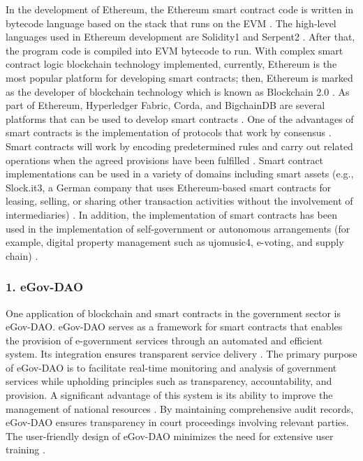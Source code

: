 In the development of Ethereum, the Ethereum smart contract code is written in bytecode language based on the stack that runs on the  \ac{EVM} \cite{everett_kevm}\cite{ahmed_hawk}. The high-level languages used in Ethereum development are Solidity1 and Serpent2 \cite{everett_kevm}. After that, the program code is compiled into \ac{EVM} bytecode to run. With complex smart contract logic blockchain technology implemented, currently, Ethereum is the most popular platform for developing smart contracts; then, Ethereum is marked as the developer of blockchain technology which is known as Blockchain 2.0 \cite{imran_mastering_blockchain}. As part of Ethereum, Hyperledger Fabric, Corda, and BigchainDB are several platforms that can be used to develop smart contracts \cite{khaled_blockchain_ai}.
One of the advantages of smart contracts is the implementation of protocols that work by consensus \cite{christian_smart_contract_lifecycle}\cite{massimo_smart_contract_analysis}. Smart contracts will work by encoding predetermined rules and carry out related operations when the agreed provisions have been fulfilled \cite{pierluigi_smart_contracts}. Smart contract implementations can be used in a variety of domains including smart assets \cite{steve_cryptocurrencies_smart_contracts} (e.g., Slock.it3, a German company that uses Ethereum-based smart contracts for leasing, selling, or sharing other transaction activities without the involvement of intermediaries) \cite{steve_cryptocurrencies_smart_contracts}. In addition, the implementation of smart contracts has been used in the implementation of self-government or autonomous arrangements (for example, digital property management such as ujomusic4, e-voting, and supply chain) \cite{natalie_blockchain_media_sector}.


\subsubsection{1. \ac{eGov-DAO}}
  
        One application of blockchain and smart contracts in the government sector is \ac{eGov-DAO}. \ac{eGov-DAO} serves as a framework for smart contracts that enables the provision of e-government services through an automated and efficient system. Its integration ensures transparent service delivery \cite{nour2018egovdao}. The primary purpose of \ac{eGov-DAO} is to facilitate real-time monitoring and analysis of government services while upholding principles such as transparency, accountability, and provision. A significant advantage of this system is its ability to improve the management of national resources \cite{nour2018egovdao}. By maintaining comprehensive audit records, \ac{eGov-DAO} ensures transparency in court proceedings involving relevant parties. The user-friendly design of \ac{eGov-DAO} minimizes the need for extensive user training \cite{nour2018egovdao}.

